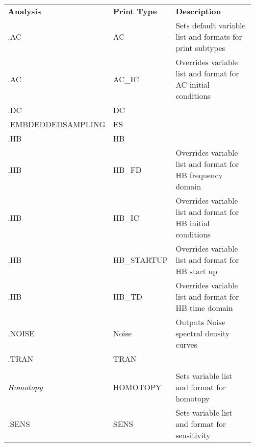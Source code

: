 

{
\renewcommand{\arraystretch}{1.2}
\begin{tabular}{>{\ttfamily\small}m{1.5in}<{\normalfont}>{\ttfamily\small}m{0.75in}<{\normalfont}m{2.25in}@{}}
  \rowcolor{XyceDarkBlue}
  \color{white}\normalfont\bf Analysis &
  \color{white}\bf Print Type &
  \color{white}\bf Description \\
.AC & AC & Sets default variable list and formats for print subtypes \\ \hline
.AC & AC\_IC & Overrides variable list and format for AC initial conditions \\ \hline
.DC & DC &  \\ \hline
.EMBDEDDEDSAMPLING & ES & \\ \hline
.HB & HB & \\ \hline
.HB & HB\_FD & Overrides variable list and format for HB frequency domain \\ \hline
.HB & HB\_IC & Overrides variable list and format for HB initial conditions \\ \hline
.HB & HB\_STARTUP & Overrides variable list and format for HB start up \\ \hline
.HB & HB\_TD & Overrides variable list and format for HB time domain \\ \hline
.NOISE & Noise & Outputs Noise spectral density curves\\ \hline
.TRAN & TRAN &  \\ \hline
\multicolumn{3}{c}{\smallskip\color{XyceDarkBlue}\em\bfseries Specialized Output Commands} \\
\emph{Homotopy} & HOMOTOPY & Sets variable list and format for homotopy \\ \hline
.SENS & SENS & Sets variable list and format for sensitivity \\ \hline
\end{tabular}
}
